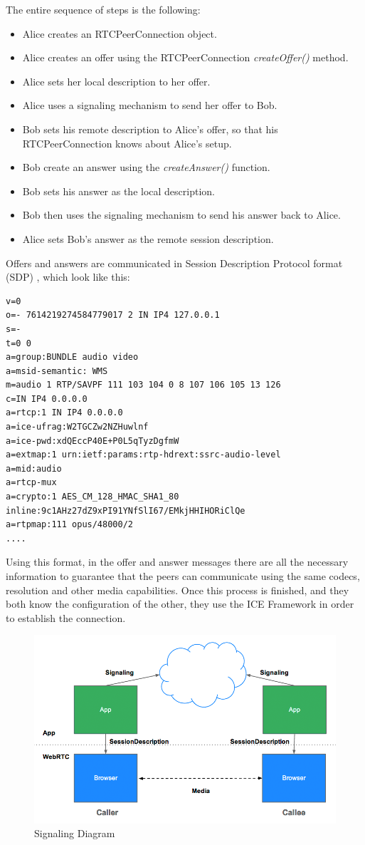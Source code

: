 The entire sequence of steps is the following:
\begin{itemize}
	\item Alice creates an RTCPeerConnection object.
	\item Alice creates an offer using the RTCPeerConnection \textit{createOffer()} method.
	\item Alice sets her local description to her offer.
	\item Alice uses a signaling mechanism to send her offer to Bob.
	\item Bob sets his remote description to Alice's offer, so that his RTCPeerConnection knows about Alice's setup.
	\item Bob create an answer using the \textit{createAnswer()} function.
	\item Bob sets his answer as the local description.
	\item Bob then uses the signaling mechanism to send his answer back to Alice.
	\item Alice sets Bob's answer as the remote session description.
\end{itemize}
Offers and answers are communicated in Session Description Protocol format (SDP) \cite{sdp}, which look like this:
\begin{verbatim}
v=0
o=- 7614219274584779017 2 IN IP4 127.0.0.1
s=-
t=0 0
a=group:BUNDLE audio video
a=msid-semantic: WMS
m=audio 1 RTP/SAVPF 111 103 104 0 8 107 106 105 13 126
c=IN IP4 0.0.0.0
a=rtcp:1 IN IP4 0.0.0.0
a=ice-ufrag:W2TGCZw2NZHuwlnf
a=ice-pwd:xdQEccP40E+P0L5qTyzDgfmW
a=extmap:1 urn:ietf:params:rtp-hdrext:ssrc-audio-level
a=mid:audio
a=rtcp-mux
a=crypto:1 AES_CM_128_HMAC_SHA1_80 inline:9c1AHz27dZ9xPI91YNfSlI67/EMkjHHIHORiClQe
a=rtpmap:111 opus/48000/2
....
\end{verbatim}
Using this format, in the offer and answer messages there are all the necessary information to guarantee that the peers can communicate using the same codecs, resolution and other media capabilities. 
Once this process is finished, and they both know the configuration of the other, they use the ICE Framework in order to establish the connection.

\begin{figure}[ht]
  \centering
  \includegraphics[keepaspectratio=true, width=\textwidth]{images/jsep}\caption{Signaling Diagram}
  \label{fig:jsep}
\end{figure}

